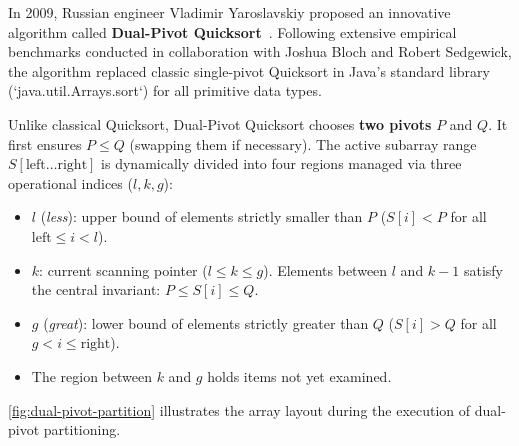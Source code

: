 In 2009, Russian engineer Vladimir Yaroslavskiy proposed an innovative algorithm called \textbf{Dual-Pivot Quicksort}~\cite{yaroslavskiy2009}. Following extensive empirical benchmarks conducted in collaboration with Joshua Bloch and Robert Sedgewick, the algorithm replaced classic single-pivot Quicksort in Java's standard library (`java.util.Arrays.sort`) for all primitive data types.

Unlike classical Quicksort, Dual-Pivot Quicksort chooses \textbf{two pivots} $P$ and $Q$. It first ensures $P \le Q$ (swapping them if necessary). The active subarray range $S[\text{left} \dots \text{right}]$ is dynamically divided into four regions managed via three operational indices ($l, k, g$):

\begin{itemize}
  \item $l$ (\textit{less}): upper bound of elements strictly smaller than $P$ ($S[i] < P$ for all $\text{left} \le i < l$).
  \item $k$: current scanning pointer ($l \le k \le g$). Elements between $l$ and $k-1$ satisfy the central invariant: $P \le S[i] \le Q$.
  \item $g$ (\textit{great}): lower bound of elements strictly greater than $Q$ ($S[i] > Q$ for all $g < i \le \text{right}$).
  \item The region between $k$ and $g$ holds items not yet examined.
\end{itemize}

\autoref{fig:dual-pivot-partition} illustrates the array layout during the execution of dual-pivot partitioning.


